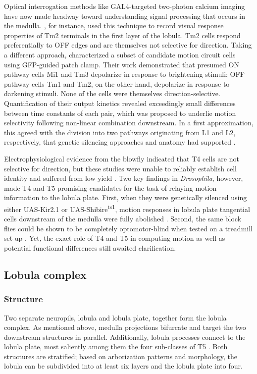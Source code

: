 Optical interrogation methods like GAL4-targeted two-photon calcium imaging have now made headway toward understanding signal processing that occurs in the medulla. \citet{Meier:2014fr}, for instance, used this technique to record visual response properties of Tm2 terminals in the first layer of the lobula. Tm2 cells respond preferentially to OFF edges and are themselves not selective for direction. Taking a different approach, \citet{Behnia:2014jh} characterized a subset of candidate motion circuit cells using GFP-guided patch clamp. Their work demonstrated that presumed ON pathway cells Mi1 and Tm3 depolarize in response to brightening stimuli; OFF pathway cells Tm1 and Tm2, on the other hand, depolarize in response to darkening stimuli. None of the cells were themselves direction-selective. Quantification of their output kinetics revealed exceedingly small differences between time constants of each pair, which was proposed to underlie motion selectivity following non-linear combination downstream. In a first approximation, this agreed with the division into two pathways originating from L1 and L2, respectively, that genetic silencing approaches and anatomy had supported \citep{Joesch:2010fw,Takemura:2013ea}.

Electrophysiological evidence from the blowfly indicated that T4 cells are not selective for direction, but these studies were unable to reliably establish cell identity and suffered from low yield \citep{Douglass:1996aa}. Two key findings in \textit{Drosophila}, however, made T4 and T5 promising candidates for the task of relaying motion information to the lobula plate. First, when they were genetically silenced using either UAS-Kir2.1 or UAS-Shibire\textsuperscript{ts1}, motion responses in lobula plate tangential cells downstream of the medulla were fully abolished \citep{Schnell:2012iz}. Second, the same block flies could be shown to be completely optomotor-blind when tested on a treadmill set-up \citep{Bahl:2013ha}. Yet, the exact role of T4 and T5 in computing motion as well as potential functional differences still awaited clarification.

\subsection{Lobula complex}

\subsubsection{Structure}
Two separate neuropils, lobula and lobula plate, together form the lobula complex. As mentioned above, medulla projections bifurcate and target the two downstream structures in parallel. Additionally, lobula processes connect to the lobula plate, most saliently among them the four sub-classes of T5 \citep{Fischbach:1989uw}. Both structures are stratified; based on arborization patterns and morphology, the lobula can be subdivided into at least six layers and the lobula plate into four.

